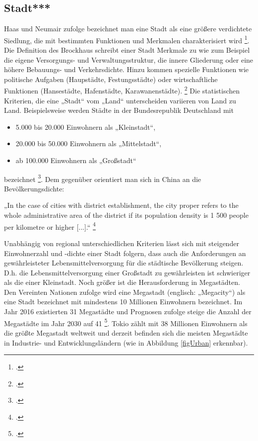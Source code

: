\documentclass{scrartcl}
\begin{document}
\subsection{Stadt***}

Haas und Neumair zufolge bezeichnet man eine Stadt als eine größere verdichtete Siedlung, die mit bestimmten Funktionen und Merkmalen charakterisiert wird \footcite{HaasDefinitionWirtschaftslexikon}. Die Definition des Brockhaus schreibt einer Stadt Merkmale zu wie zum Beispiel die eigene Versorgungs- und Verwaltungsstruktur, die innere Gliederung oder eine höhere Bebauungs- und Verkehrsdichte. Hinzu kommen spezielle Funktionen wie politische Aufgaben (Haupstädte, Festungsstädte) oder wirtschaftliche Funktionen (Hansestädte, Hafenstädte, Karawanenstädte). \footcite{BrockhausStadt} Die statistischen Kriterien, die eine „Stadt“ vom „Land“ unterscheiden variieren von Land zu Land. Beispielsweise werden Städte in der Bundesrepublik Deutschland mit 
\begin{itemize}
\item 5.000 bis 20.000 Einwohnern als „Kleinstadt“,
\item 20.000 bis 50.000 Einwohnern als „Mittelstadt“,
\item ab 100.000 Einwohnern als „Großstadt“ 
\end{itemize}
bezeichnet \footcite{Institutinternationaldestatistique1887BulletinStatistique}. Dem gegenüber orientiert man sich in China an die Bevölkerungsdichte: 

\begin{displayquote}
„In the case of cities with district establishment, the city proper refers to the whole administrative area of the district if its population density is 1 500 people per kilometre or higher [...].“ \footcite[S.~2]{UnitedNations2005Table2005} 
\end{displayquote}

Unabhängig von regional unterschiedlichen Kriterien lässt sich mit steigender Einwohnerzahl und -dichte einer Stadt folgern, dass auch die Anforderungen an gewährleisteter Lebensmittelversorgung für die städtische Bevölkerung steigen. D.h. die Lebensmittelversorgung einer Großstadt zu gewährleisten ist schwieriger als die einer Kleinstadt. Noch größer ist die Herausforderung in Megastädten. Den Vereinten Nationen zufolge wird eine Megastadt (englisch: „Megacity“) als eine Stadt bezeichnet mit mindestens 10 Millionen Einwohnern bezeichnet. Im Jahr 2016 existierten 31 Megastädte und Prognosen zufolge steige die Anzahl der Megastädte im Jahr 2030 auf 41 \footcite{UnitedNations2016The2016}. Tokio zählt mit 38 Millionen Einwohnern als die größte Megastadt weltweit und derzeit befinden sich die meisten Megastädte in Industrie- und Entwicklungsländern (wie in Abbildung \ref{figUrban} erkennbar). 
\end{document}
